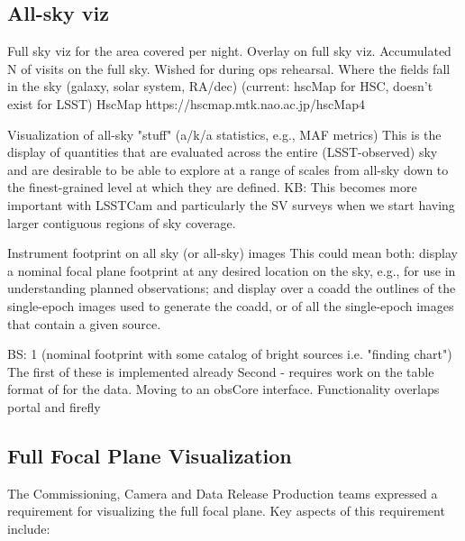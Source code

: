 
\subsection{All-sky viz}
 Full sky viz for the area covered per night.  Overlay on full sky viz. Accumulated N of visits on the full sky. Wished for during ops rehearsal.
Where the fields fall in the sky (galaxy, solar system, RA/dec)  (current: hscMap for HSC, doesn't  exist for LSST)
HscMap https://hscmap.mtk.nao.ac.jp/hscMap4

Visualization of all-sky "stuff" (a/k/a statistics, e.g., MAF metrics)
This is the display of quantities that are evaluated across the entire (LSST-observed) sky and are desirable to be able to explore at a range of scales from all-sky down to the finest-grained level at which they are defined.
KB: This becomes more important with LSSTCam and particularly the SV surveys when we start having larger contiguous regions of sky coverage.

Instrument footprint on all sky (or all-sky) images
This could mean both:
display a nominal focal plane footprint at any desired location on the sky, e.g., for use in understanding planned observations; and
display over a coadd the outlines of the single-epoch images used to generate the coadd, or of all the single-epoch images that contain a given source.

BS: 1 (nominal footprint with some catalog of bright sources i.e. "finding chart")
The first of these is implemented already
Second - requires work on the table format of for the data. Moving to an obsCore interface. Functionality overlaps portal and firefly


\subsection{Full Focal Plane Visualization}
\label{sec:features:focal_plane}

The Commissioning, Camera and Data Release Production teams expressed a requirement for visualizing the full focal plane.
Key aspects of this requirement include:

